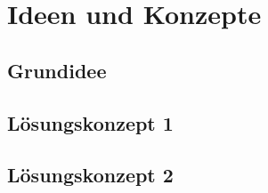\chapter{Ideen und Konzepte}

\section{Grundidee}

\section{Lösungskonzept 1}

\section{Lösungskonzept 2}
